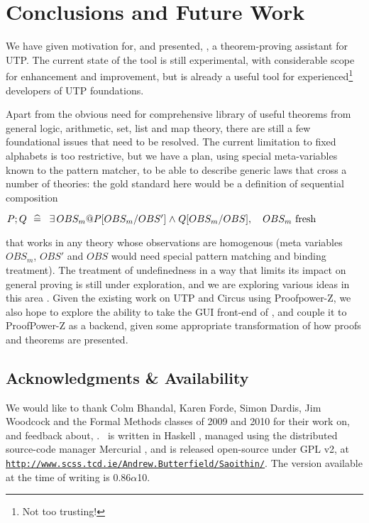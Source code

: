 \section{Conclusions and Future Work}
\label{sec:conclusions}

We have given motivation for, and presented, \STHN,
a theorem-proving assistant for UTP.
The current state of the tool is still experimental,
with considerable scope for enhancement and improvement,
but is already a useful tool for experienced\footnote{Not too trusting!}
developers of UTP foundations.

Apart from the obvious need for comprehensive library of useful theorems
from general logic, arithmetic, set, list and map theory,
there are still a few foundational issues that need to be resolved.
The current limitation to fixed alphabets is too restrictive,
but we have a plan, using special meta-variables known to the pattern matcher,
to be able to describe generic laws that cross a number of theories:
the gold standard here would be a definition of sequential composition\
\begin{center}
$
  P ; Q
  ~~\defs~~
  \exists OBS_m @ P[OBS_m/OBS'] \land Q[OBS_m/OBS],
   \quad OBS_m \mbox{ fresh}
$
\end{center}
that works in any theory whose observations are homogenous
(meta variables $OBS_m$, $OBS'$ and $OBS$ would need special pattern matching
and binding treatment).
The treatment of undefinedness in a way that limits its impact on general proving
is still under exploration, and we are exploring various ideas in this area
\cite{wkshp/mpf/arthan:96}.
Given the existing work on UTP and Circus using Proofpower-Z,
we also hope to explore the ability to take the GUI front-end of \STHN,
and couple it to ProofPower-Z as a backend, given some appropriate transformation
of how proofs and theorems are presented.

\subsection{Acknowledgments \& Availability}


We would like to thank Colm Bhandal, Karen Forde, Simon Dardis,
Jim Woodcock and the Formal Methods classes of 2009 and 2010
for their work on, and feedback about, \STHN. \STHN\ is written
in Haskell \cite{rep:Haskell:98}, managed using the distributed
source-code manager Mercurial \cite{bk:mercurial:BOS:09}, and
is released open-source under GPL v2, at
\texttt{\url{http://www.scss.tcd.ie/Andrew.Butterfield/Saoithin/}}.
The version available at the time of writing is 0.86$\alpha$10.
